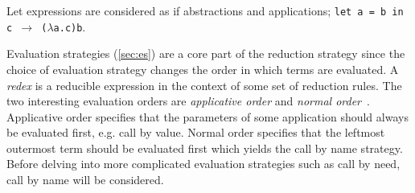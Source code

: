 \documentclass[11pt,oneside,a4paper]{report}
\begin{document}
\begin{remark}
Let expressions are considered as if abstractions and applications; \texttt{let a = b in c $\rightarrow$ ($\lambda$a.c)b}.
\end{remark}

Evaluation strategies (\autoref{sec:es}) are a core part of the reduction strategy since the choice of evaluation strategy changes the order in which terms are evaluated.
A \textit{redex} is a reducible expression in the context of some set of reduction rules.
The two interesting evaluation orders are \textit{applicative order} and \textit{normal order}~\cite{sestoft2002demonstrating}.
Applicative order specifies that the parameters of some application should always be evaluated first, e.g. call by value.
Normal order specifies that the leftmost outermost term should be evaluated first which yields the call by name strategy.
Before delving into more complicated evaluation strategies such as call by need, call by name will be considered.
\end{document}

